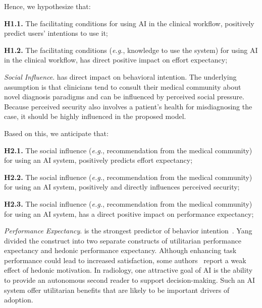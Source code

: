 \vspace{2.25mm}

\noindent
Hence, we hypothesize that:

\vspace{2.25mm}

\noindent
{\bf H1.1.} The facilitating conditions for using AI in the clinical workflow, positively predict users' intentions to use it;

\vspace{2.25mm}

\noindent
{\bf H1.2.} The facilitating conditions ({\it e.g.}, knowledge to use the system) for using AI in the clinical workflow, has direct positive impact on effort expectancy;

\vspace{2.25mm}

{\it Social Influence}. has direct impact on behavioral intention.
The underlying assumption is that clinicians tend to consult their medical community about novel diagnosis paradigms and can be influenced by perceived social pressure.
Because perceived security also involves a patient's health for misdiagnosing the case, it should be highly influenced in the proposed model.

\vspace{2.25mm}

\noindent
Based on this, we anticipate that:

\vspace{2.25mm}

\noindent
{\bf H2.1.} The social influence ({\it e.g.}, recommendation from the medical community) for using an AI system, positively predicts effort expectancy;

\vspace{2.25mm}

\noindent
{\bf H2.2.} The social influence ({\it e.g.}, recommendation from the medical community) for using an AI system, positively and directly influences perceived security;

\vspace{2.25mm}

\noindent
{\bf H2.3.} The social influence ({\it e.g.}, recommendation from the medical community) for using an AI system, has a direct positive impact on performance expectancy;

\vspace{2.25mm}

{\it Performance Expectancy}. is the strongest predictor of behavior intention~\cite{KHALILZADEH2017460}.
Yang~\cite{Yang2010} divided the construct into two separate constructs of utilitarian performance expectancy and hedonic performance expectancy.
Although enhancing task performance could lead to increased satisfaction, some authors~\cite{ESCOBARRODRIGUEZ201470, HART201993} report a weak effect of hedonic motivation.
In radiology, one attractive goal of AI is the ability to provide an autonomous second reader to support decision-making.
Such an AI system offer utilitarian benefits that are likely to be important drivers of adoption.

